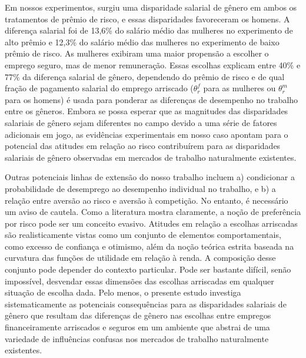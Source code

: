 \documentclass[a4paper,12pt]{article}[abntex2]
\begin{document}
Em nossos experimentos, surgiu uma disparidade salarial de gênero em ambos os tratamentos de prêmio de risco, e essas disparidades favoreceram os homens. A diferença salarial foi de 13,6\% do salário médio das mulheres no experimento de alto prêmio e 12,3\% do salário médio das mulheres no experimento de baixo prêmio de risco. As mulheres exibiram uma maior propensão a escolher o emprego seguro, mas de menor remuneração. Essas escolhas explicam entre 40\% e 77\% da diferença salarial de gênero, dependendo do prêmio de risco e de qual fração de pagamento salarial do emprego arriscado ($\theta_r^f$ para as mulheres ou $\theta_r^m$ para os homens) é usada para ponderar as diferenças de desempenho no trabalho entre os gêneros. Embora se possa esperar que as magnitudes das disparidades salariais de gênero sejam diferentes no campo devido a uma série de fatores adicionais em jogo, as evidências experimentais em nosso caso apontam para o potencial das atitudes em relação ao risco contribuírem para as disparidades salariais de gênero observadas em mercados de trabalho naturalmente existentes.

Outras potenciais linhas de extensão do nosso trabalho incluem a) condicionar a probabilidade de desemprego ao desempenho individual no trabalho, e b) a relação entre aversão ao risco e aversão à competição. No entanto, é necessário um aviso de cautela. Como a literatura mostra claramente, a noção de preferência por risco pode ser um conceito evasivo. Atitudes em relação a escolhas arriscadas são realisticamente vistas como um conjunto de elementos comportamentais, como excesso de confiança e otimismo, além da noção teórica estrita baseada na curvatura das funções de utilidade em relação à renda. A composição desse conjunto pode depender do contexto particular. Pode ser bastante difícil, senão impossível, desvendar essas dimensões das escolhas arriscadas em qualquer situação de escolha dada. Pelo menos, o presente estudo investiga sistematicamente as potenciais consequências para as disparidades salariais de gênero que resultam das diferenças de gênero nas escolhas entre empregos financeiramente arriscados e seguros em um ambiente que abstrai de uma variedade de influências confusas nos mercados de trabalho naturalmente existentes.
\end{document}
